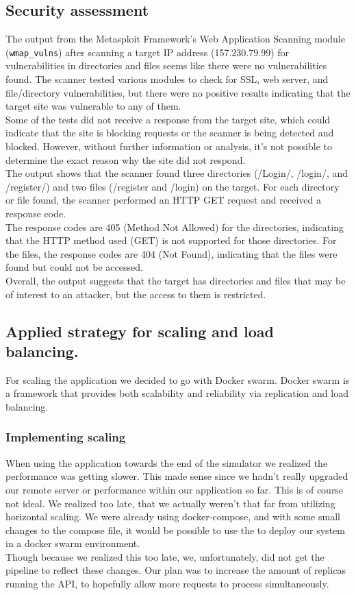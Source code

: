 \documentclass{article}
\begin{document}
\subsection{Security assessment}
The output from the Metasploit Framework's Web Application Scanning module (\verb|wmap_vulns|) after scanning a target IP address (157.230.79.99) for vulnerabilities in directories and files seems like there were no vulnerabilities found. The scanner tested various modules to check for SSL, web server, and file/directory vulnerabilities, but there were no positive results indicating that the target site was vulnerable to any of them.\\ 
Some of the tests did not receive a response from the target site, which could indicate that the site is blocking requests or the scanner is being detected and blocked. However, without further information or analysis, it's not possible to determine the exact reason why the site did not respond.\\
The output shows that the scanner found three directories (/Login/, /login/, and /register/) and two files (/register and /login) on the target. For each directory or file found, the scanner performed an HTTP GET request and received a response code.\\
The response codes are 405 (Method Not Allowed) for the directories, indicating that the HTTP method used (GET) is not supported for those directories. For the files, the response codes are 404 (Not Found), indicating that the files were found but could not be accessed.\\
Overall, the output suggests that the target has directories and files that may be of interest to an attacker, but the access to them is restricted.

\subsection{Applied strategy for scaling and load balancing.}
For scaling the application we decided to go with Docker swarm. Docker swarm is a framework that provides both scalability and reliability via replication and load balancing.
\subsubsection{Implementing scaling}
When using the application towards the end of the simulator we realized the performance was getting slower. This made sense since we hadn't really upgraded our remote server or performance within our application so far. This is of course not ideal.
We realized too late, that we actually weren't that far from utilizing horizontal scaling. We were already using docker-compose, and with some small changes to the compose file, it would be possible to use the  to deploy our system in a docker swarm environment.\\
Though because we realized this too late, we, unfortunately, did not get the pipeline to reflect these changes. Our plan was to increase the amount of replicas running the API, to hopefully allow more requests to process simultaneously.\\
\end{document}
